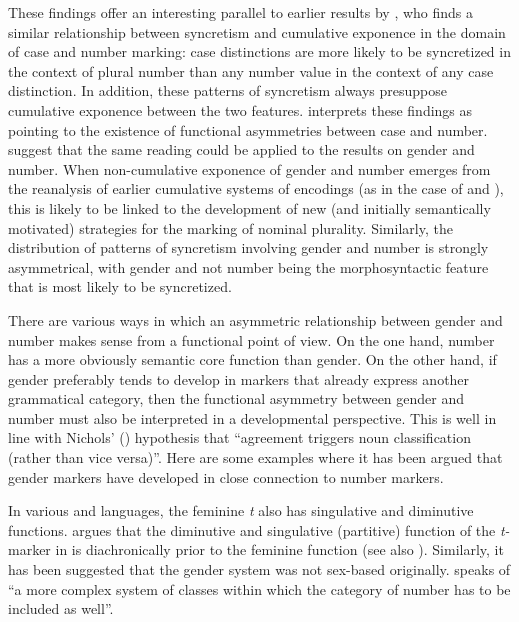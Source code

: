 \documentclass[output=collectionpaper]{langsci/langscibook}
\begin{document}
These findings offer an interesting parallel to earlier results by \cite{Carstairs1987}, who finds a similar relationship between syncretism and cumulative exponence in the domain of case and number marking: case distinctions are more likely to be syncretized in the context of plural number than any number value in the context of any case distinction. In addition, these patterns of syncretism always presuppose cumulative exponence between the two features. \cite{Carstairs1987} interprets these findings as pointing to the existence of functional asymmetries between case and number. \cite[205--206]{DiGarbo2018a} suggest that the same reading could be applied to the results on gender and number. When non-cumulative exponence of gender and number emerges from the reanalysis of earlier cumulative systems of encodings (as in the case of  and ), this is likely to be linked to the development of new (and initially semantically motivated) strategies for the marking of nominal plurality. Similarly, the distribution of patterns of syncretism involving gender and number is strongly asymmetrical, with gender \textendash{} and not number \textendash{} being the morphosyntactic feature that is most likely to be syncretized.

There are various ways in which an asymmetric relationship between gender and number makes sense from a functional point of view. On the one hand, number has a more obviously semantic core function than gender. On the other hand, if gender preferably tends to develop in markers that already express another grammatical category, then the functional asymmetry between gender and number must also be interpreted in a developmental perspective. This is well in line with Nichols' (\citeyear[142]{Nichols1992}) hypothesis that ``agreement triggers noun classification (rather than vice versa)''. Here are some examples where it has been argued that gender markers have developed in close connection to number markers.

In various  and  languages, the feminine \textit{t} also has singulative and diminutive functions. \cite[221]{Mettouchi2000} argues that the diminutive and singulative (partitive) function of the \textit{t-} marker in  is diachronically prior to the feminine function (see also ). Similarly, it has been suggested that the  gender system was not sex-based originally. \cite[86]{Moscati1964} speaks of ``a more complex system of classes within which the category of number has to be included as well''.
\end{document}
